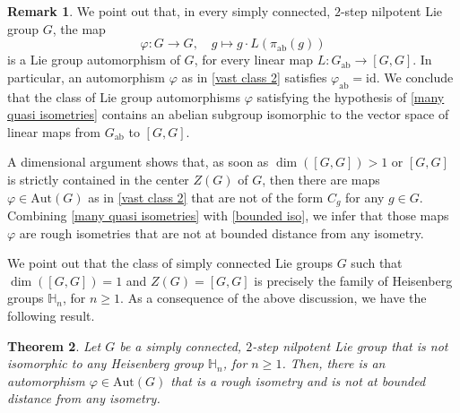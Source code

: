 \documentclass[a4paper,11pt,reqno]{amsart}
\theoremstyle{plain}
\newtheorem{theorem}{Theorem}[section]
\theoremstyle{definition}
\newtheorem{remark}[theorem]{Remark}
\renewcommand{\H}{\mathbb H}
\newcommand{\vphi}{\varphi}
\newcommand{\id}{e}
\newcommand{\de}{\mathrm{d}}
\begin{document}
 


\begin{remark}
 We point out that, in every simply connected, $2$-step nilpotent Lie group $G$, the map
\begin{equation} \label{vast class 2}
 \vphi \colon G \to G, \quad g \mapsto g \cdot L(\pi_\mathrm{ab}(g))
\end{equation}
is a Lie group automorphism of $G$, for every linear map $L \colon G_\mathrm{ab} \to [G,G]$. In particular, an automorphism $\vphi$ as in \eqref{vast class 2} satisfies $\vphi_\mathrm{ab}=\mathrm{id}$. We conclude that the class of Lie group automorphisms $\vphi$ satisfying the hypothesis of \cref{many quasi isometries} contains an abelian subgroup isomorphic to the vector space of linear maps from $G_\mathrm{ab}$ to $[G, G]$. 

A dimensional argument shows that, as soon as $\dim([G ,G])>1$ or $[G, G]$ is strictly contained in the center $Z(G)$ of $G$, then there are maps $\vphi \in \mathrm{Aut}(G)$ as in \eqref{vast class 2} that are not of the form $C_g$ for any $g \in G$. Combining \cref{many quasi isometries} with \cref{bounded iso}, we infer that those maps $\vphi$ are rough isometries that are not at bounded distance from any isometry.
\end{remark}

We point out that the class of simply connected Lie groups $G$ such that $\dim([G, G])=1$ and $Z(G)=[G, G]$ is precisely the family of Heisenberg groups $\H_n$, for $n \ge 1$.
As a consequence of the above discussion, we have the following result.

\begin{theorem}
 Let $G$ be a simply connected, $2$-step nilpotent Lie group that is not isomorphic to any Heisenberg group $\H_n$, for $n \ge 1$.
 Then, there is an automorphism $\vphi \in \mathrm{Aut}(G)$ that is a rough isometry and is not at bounded distance from any isometry.
\end{theorem}
\end{document}
